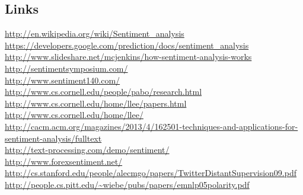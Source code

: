 \subsection{Links}
\url{http://en.wikipedia.org/wiki/Sentiment_analysis}\\
\url{https://developers.google.com/prediction/docs/sentiment_analysis}\\
\url{http://www.slideshare.net/mcjenkins/how-sentiment-analysis-works}\\
\url{http://sentimentsymposium.com/}\\
\url{http://www.sentiment140.com/}\\
\url{http://www.cs.cornell.edu/people/pabo/research.html}\\
\url{http://www.cs.cornell.edu/home/llee/papers.html}\\
\url{http://www.cs.cornell.edu/home/llee/}\\
\url{http://cacm.acm.org/magazines/2013/4/162501-techniques-and-applications-for-sentiment-analysis/fulltext}\\
\url{http://text-processing.com/demo/sentiment/}\\
\url{http://www.forexsentiment.net/}\\
\url{http://cs.stanford.edu/people/alecmgo/papers/TwitterDistantSupervision09.pdf}\\
\url{http://people.cs.pitt.edu/~wiebe/pubs/papers/emnlp05polarity.pdf}\\


